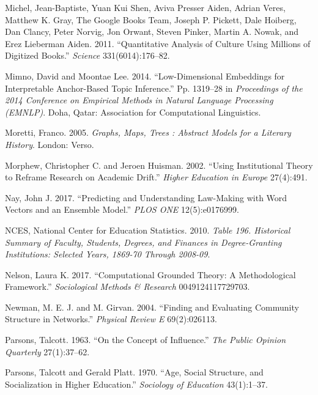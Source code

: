 \documentclass[]{book}
\theoremstyle{definition}
\theoremstyle{definition}
\theoremstyle{definition}
\theoremstyle{remark}
\begin{document}
\leavevmode\hypertarget{ref-Michel2011Quantitative}{}%
Michel, Jean-Baptiste, Yuan Kui Shen, Aviva Presser Aiden, Adrian Veres,
Matthew K. Gray, The Google Books Team, Joseph P. Pickett, Dale Hoiberg,
Dan Clancy, Peter Norvig, Jon Orwant, Steven Pinker, Martin A. Nowak,
and Erez Lieberman Aiden. 2011. ``Quantitative Analysis of Culture Using
Millions of Digitized Books.'' \emph{Science} 331(6014):176--82.

\leavevmode\hypertarget{ref-Mimno2014Lowdimensional}{}%
Mimno, David and Moontae Lee. 2014. ``Low-Dimensional Embeddings for
Interpretable Anchor-Based Topic Inference.'' Pp. 1319--28 in
\emph{Proceedings of the 2014 Conference on Empirical Methods in Natural
Language Processing (EMNLP)}. Doha, Qatar: Association for Computational
Linguistics.

\leavevmode\hypertarget{ref-Moretti2005Graphs}{}%
Moretti, Franco. 2005. \emph{Graphs, Maps, Trees : Abstract Models for a
Literary History}. London: Verso.

\leavevmode\hypertarget{ref-Morphew2002Using}{}%
Morphew, Christopher C. and Jeroen Huisman. 2002. ``Using Institutional
Theory to Reframe Research on Academic Drift.'' \emph{Higher Education
in Europe} 27(4):491.

\leavevmode\hypertarget{ref-Nay2017Predicting}{}%
Nay, John J. 2017. ``Predicting and Understanding Law-Making with Word
Vectors and an Ensemble Model.'' \emph{PLOS ONE} 12(5):e0176999.

\leavevmode\hypertarget{ref-NCES2010Table}{}%
NCES, National Center for Education Statistics. 2010. \emph{Table 196.
Historical Summary of Faculty, Students, Degrees, and Finances in
Degree-Granting Institutions: Selected Years, 1869-70 Through 2008-09}.

\leavevmode\hypertarget{ref-Nelson2017Computational}{}%
Nelson, Laura K. 2017. ``Computational Grounded Theory: A Methodological
Framework.'' \emph{Sociological Methods \& Research} 0049124117729703.

\leavevmode\hypertarget{ref-Newman2004Finding}{}%
Newman, M. E. J. and M. Girvan. 2004. ``Finding and Evaluating Community
Structure in Networks.'' \emph{Physical Review E} 69(2):026113.

\leavevmode\hypertarget{ref-Parsons1963Concept}{}%
Parsons, Talcott. 1963. ``On the Concept of Influence.'' \emph{The
Public Opinion Quarterly} 27(1):37--62.

\leavevmode\hypertarget{ref-Parsons1970Age}{}%
Parsons, Talcott and Gerald Platt. 1970. ``Age, Social Structure, and
Socialization in Higher Education.'' \emph{Sociology of Education}
43(1):1--37.
\end{document}
